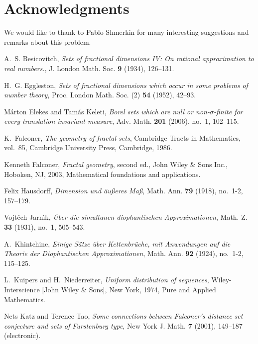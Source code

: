 \documentclass[11pt,a4paper]{amsart}
\begin{document}
\section*{Acknowledgments}
We would like to thank to Pablo Shmerkin for many interesting
suggestions and remarks about this problem.


\begin{thebibliography}{Wol99}

A.~S. Besicovitch, \emph{Sets of fractional dimensions {IV}: On rational
  approximation to real numbers.}, J. London Math. Soc. \textbf{9} (1934),
  126--131.

H.~G. Eggleston, \emph{Sets of fractional dimensions which occur in some
  problems of number theory}, Proc. London Math. Soc. (2) \textbf{54} (1952),
  42--93.

M{\'a}rton Elekes and Tam{\'a}s Keleti, \emph{Borel sets which are null or
  non-{$\sigma$}-finite for every translation invariant measure}, Adv. Math.
  \textbf{201} (2006), no.~1, 102--115.

K.~Falconer, \emph{The geometry of fractal sets}, Cambridge Tracts in
  Mathematics, vol.~85, Cambridge University Press, Cambridge, 1986.

Kenneth Falconer, \emph{Fractal geometry}, second ed., John Wiley \& Sons Inc.,
  Hoboken, NJ, 2003, Mathematical foundations and applications.

Felix Hausdorff, \emph{Dimension und \"au\ss eres {M}a\ss}, Math. Ann.
  \textbf{79} (1918), no.~1-2, 157--179.

Vojt\v{e}ch Jarn{\'{\i}}k, \emph{\"{U}ber die simultanen diophantischen
  {A}pproximationen}, Math. Z. \textbf{33} (1931), no.~1, 505--543.

A.~Khintchine, \emph{Einige {S}\"atze \"uber {K}ettenbr\"uche, mit
  {A}nwendungen auf die {T}heorie der {D}iophantischen {A}pproximationen},
  Math. Ann. \textbf{92} (1924), no.~1-2, 115--125.

L.~Kuipers and H.~Niederreiter, \emph{Uniform distribution of sequences},
  Wiley-Interscience [John Wiley \& Sons], New York, 1974, Pure and Applied
  Mathematics.

Nets Katz and Terence Tao, \emph{Some connections between {F}alconer's distance
  set conjecture and sets of {F}urstenburg type}, New York J. Math. \textbf{7}
  (2001), 149--187 (electronic).


\end{thebibliography}
\end{document}
